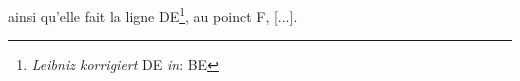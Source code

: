 \pend \pstart[p.~137] [...] ainsi qu'elle fait la ligne DE\footnote{\textit{Leibniz korrigiert} DE \textit{in}: BE}, au poinct F, [...]. \pend 